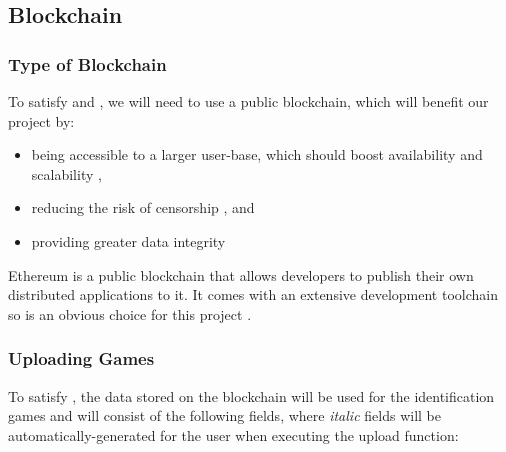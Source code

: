 
\subsection{Blockchain}\label{subsec:design-con-eth}

\subsubsection*{Type of Blockchain}

To satisfy  and , we will need to use a public blockchain, which will benefit our project by:
\vspace{2mm}
\begin{itemize}
  \item being accessible to a larger user-base, which should boost availability and scalability ,
  \item reducing the risk of censorship , and
  \item providing greater data integrity 
\end{itemize}

\vspace{2mm}\noindent Ethereum is a public blockchain that allows developers to publish their own distributed applications to it. It comes with an extensive development toolchain so is an obvious choice for this project .

\subsubsection*{Uploading Games}
\label{subsubsec:eth-data}

To satisfy , the data stored on the blockchain will be used for the identification games and will consist of the following fields, where \textit{italic} fields will be automatically-generated for the user when executing the upload function:

